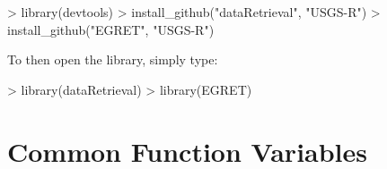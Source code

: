 \documentclass[a4paper,11pt]{article}
\begin{document}
\begin{Schunk}
\begin{Sinput}
> library(devtools)
> install_github("dataRetrieval", "USGS-R")
> install_github("EGRET", "USGS-R")
\end{Sinput}
\end{Schunk}
To then open the library, simply type:

\begin{Schunk}
\begin{Sinput}
> library(dataRetrieval)
> library(EGRET)
\end{Sinput}
\end{Schunk}

\newpage
\FloatBarrier
\section{Common Function Variables}
\label{sec:appendixPlot}
\end{document}
